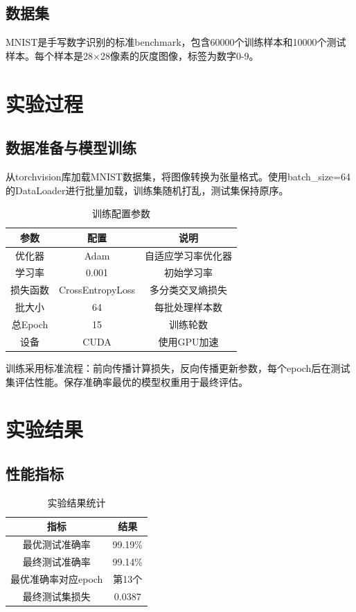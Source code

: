 \documentclass[12pt,a4paper]{article}
\begin{document}
\subsection{数据集}

MNIST是手写数字识别的标准benchmark，包含60000个训练样本和10000个测试样本。每个样本是28×28像素的灰度图像，标签为数字0-9。

\section{实验过程}

\subsection{数据准备与模型训练}

从torchvision库加载MNIST数据集，将图像转换为张量格式。使用batch\_size=64的DataLoader进行批量加载，训练集随机打乱，测试集保持原序。

\begin{table}[H]
\centering
\begin{tabular}{ccc}
\toprule
参数 & 配置 & 说明 \\
\midrule
优化器 & Adam & 自适应学习率优化器 \\
学习率 & 0.001 & 初始学习率 \\
损失函数 & CrossEntropyLoss & 多分类交叉熵损失 \\
批大小 & 64 & 每批处理样本数 \\
总Epoch & 15 & 训练轮数 \\
设备 & CUDA & 使用GPU加速 \\
\bottomrule
\end{tabular}
\caption{训练配置参数}
\label{tab:training_config}
\end{table}

训练采用标准流程：前向传播计算损失，反向传播更新参数，每个epoch后在测试集评估性能。保存准确率最优的模型权重用于最终评估。

\section{实验结果}

\subsection{性能指标}

\begin{table}[H]
\centering
\begin{tabular}{cc}
\toprule
指标 & 结果 \\
\midrule
最优测试准确率 & 99.19\% \\
最终测试准确率 & 99.14\% \\
最优准确率对应epoch & 第13个 \\
最终测试集损失 & 0.0387 \\
\bottomrule
\end{tabular}
\caption{实验结果统计}
\label{tab:results}
\end{table}
\end{document}

